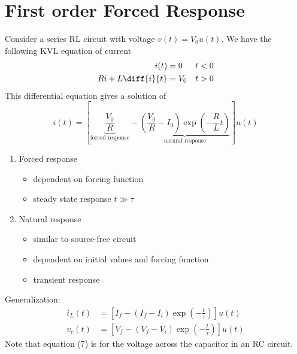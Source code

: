 \documentclass[a4paper,11pt]{article}
\begin{document}
	\section{First order Forced Response}
	Consider a series RL circuit with voltage $v(t) = V_0u(t)$. We have the following KVL equation of current
	\begin{align*}
		i(t) &= 0 & t < 0 \\
		Ri + L\diff{i}{t} &= V_0 & t > 0 
	\end{align*}
	This differential equation gives a solution of 
	\begin{equation}\label{key}
		i(t) = \left[\underbrace{\frac{V_0}{R}}_\text{forced response} - \underbrace{\left(\frac{V_0}{R} - I_0\right)\exp\left(-\frac{R}{L}t\right)}_\text{natural response}\right]u(t)
	\end{equation}
	\begin{enumerate}
		\item Forced response
			\begin{itemize}
				\item dependent on forcing function
				\item steady state response $t \gg \tau$
			\end{itemize}
		\item Natural response
			\begin{itemize}
				\item similar to source-free circuit
				\item dependent on initial values and forcing function
				\item transient response	
			\end{itemize}
	\end{enumerate}	
	Generalization:
	\begin{eqnarray}
		i_L(t) &= \left[I_f - (I_f - I_i)\exp\left(-\frac{t}{\tau}\right)\right]u(t) \\
		v_c(t) &= \left[V_f - (V_f - V_i)\exp\left(-\frac{t}{\tau}\right)\right]u(t)
	\end{eqnarray}
	Note that equation (7) is for the voltage across the capacitor in an RC circuit. 
	
\end{document}
